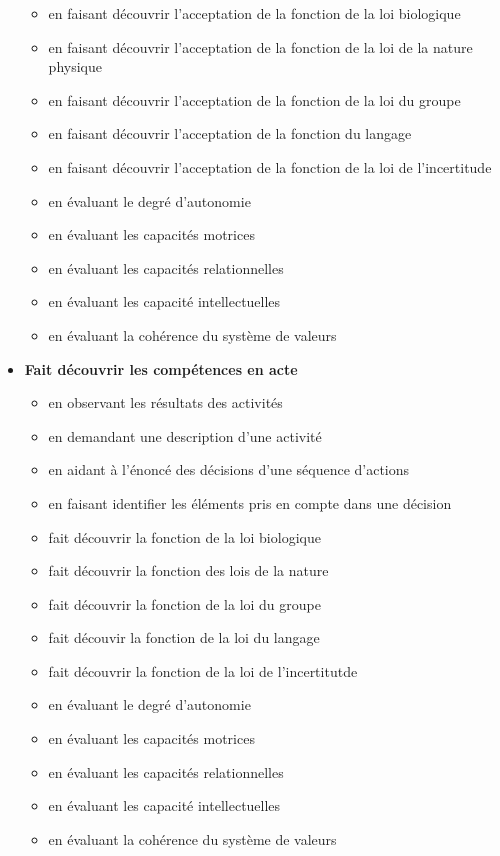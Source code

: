 \documentclass[8pt,a4paper]{article}
\begin{document}
\begin{itemize}
\begin{itemize}
\item en faisant découvrir l'acceptation de la fonction de la loi biologique
\item en faisant découvrir l'acceptation de la fonction de la loi de la nature physique
\item en faisant découvrir l'acceptation de la fonction de la loi du groupe
\item en faisant découvrir l'acceptation de la fonction du langage
\item en faisant découvrir l'acceptation de la fonction de la loi de l'incertitude
\item en évaluant le degré d'autonomie
\item en évaluant les capacités motrices
\item en évaluant les capacités relationnelles
\item en évaluant les capacité intellectuelles
\item en évaluant la cohérence du système de valeurs
\\ 
 \end{itemize}
\item \textbf{Fait découvrir les compétences en acte}
\begin{itemize}
\item en observant les résultats des activités
\item en demandant une description d'une activité
\item en aidant à l'énoncé des décisions d'une séquence d'actions
\item en faisant identifier les éléments pris en compte dans une décision
\item fait découvrir la fonction de la loi biologique
\item fait découvrir la fonction des lois de la nature
\item fait découvrir la fonction de la loi du groupe
\item fait découvir la fonction de la loi du langage
\item fait découvrir la fonction de la loi de l'incertitutde
\item en évaluant le degré d'autonomie
\item en évaluant les capacités motrices
\item en évaluant les capacités relationnelles
\item en évaluant les capacité intellectuelles
\item en évaluant la cohérence du système de valeurs
\\ 

\end{itemize}
\end{itemize}
\end{document}
